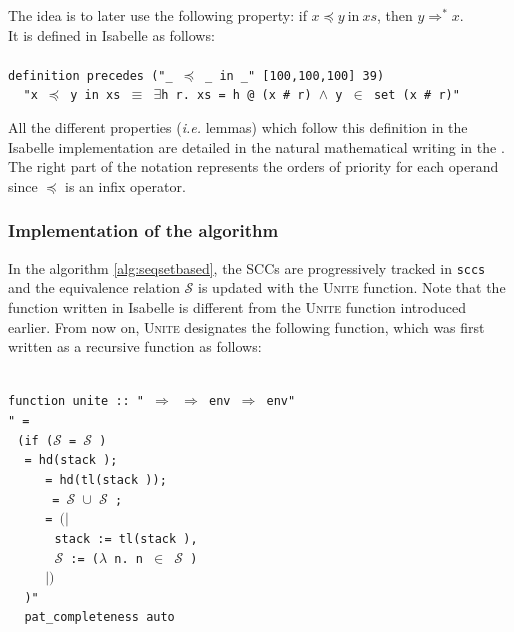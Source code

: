 \documentclass[a4 paper, 12pt]{article}
\newcommand{\where}{{\color{isa_green}{where}}}
\newcommand{\generic}[1]{{\color{isa_purple}{\textquotesingle#1}}}
\newcommand{\isa}[1]{\small\texttt{\\\noindent#1}}
\newcommand{\blue}[1]{{\color{isa_dark_blue}{#1}}}
\newcommand{\bblue}[1]{{\color{isa_blue}{#1}}}
\newcommand{\green}[1]{{\color{isa_dark_green}{#1}}}
\newcommand{\env}[1]{$(\!|$#1$|\!)$}
\theoremstyle{definition}
\begin{document}
The idea is to later use the following property: if $x \preceq y~\text{in}~xs$, then $y \Rightarrow^* x$.\\
It is defined in Isabelle as follows:\\
\isa{
    {\color{isa_blue}definition} precedes ("\_ $\preceq$ \_ in \_" [100,100,100] 39) \where\\
$~~~~~$"{\color{isa_dark_green}x} $\preceq$ {\color{isa_dark_green}y} in {\color{isa_dark_green}xs} $\equiv$ $\exists${\color{isa_dark_green}h} {\color{isa_dark_green}r}. {\color{isa_dark_green}xs} = {\color{isa_dark_green}h} @ ({\color{isa_dark_green}x} \# {\color{isa_dark_green}r}) $\wedge$ {\color{isa_dark_green}y} $\in$ set ({\color{isa_dark_green}x} \# {\color{isa_dark_green}r})"\\
}

All the different properties (\textit{i.e.} lemmas) which follow this definition in the Isabelle implementation are detailed in the natural mathematical writing in the . The right part of the notation represents the orders of priority for each operand since $\preceq$ is an infix operator.

\subsubsection{Implementation of the algorithm}

In the algorithm \ref{alg:seqsetbased}, the SCCs are progressively tracked in \texttt{sccs} and the equivalence relation $\mathcal{S}$ is updated with the \textsc{Unite} function. Note that the function written in Isabelle is different from the \textsc{Unite} function introduced earlier. From now on, \textsc{Unite} designates the following function, which was first written as a recursive function as follows:

\isa{
    {\color{isa_blue}function} unite :: "\generic{v} $\Rightarrow$ \generic{v} $\Rightarrow$ \generic{v} env $\Rightarrow$ \generic{v} env" \where{}\\
    "\blue{unite} \green{v w e} =\\
    $~~~$({\color{isa_blue}if} ($\mathcal{S}$ \green{e v} = $\mathcal{S}$ \green{e w}) \bblue{then} \green{e}\\
    $~~~$\bblue{else let} \green{r} = hd(stack \green{e});\\
    $~~~~~~~~~~~~$\green{r'}= hd(tl(stack \green{e}));\\
    $~~~~~~~~~~~~$\green{joined} = $\mathcal{S}$ \green{e r} $\cup$ $\mathcal{S}$ \green{e r};\\
    $~~~~~~~~~~~~$\green{e'}= \green{e}\env{\\
    $~~~~~~~~~~~~~~~$stack := tl(stack \green{e}),\\
    $~~~~~~~~~~~~~~~\mathcal{S}$ := ($\lambda$ n. \bblue{if} n $\in$ \green{joined} \bblue{then} \green{joined} \bblue{else} $\mathcal{S}$ \green{e n})\\
    $~~~~~~~~~~~~$}\\
    $~~~$\bblue{in} \blue{unite} \green{v w e'})"\\
    $~~~$\bblue{by} pat\_completeness auto
}
\end{document}
